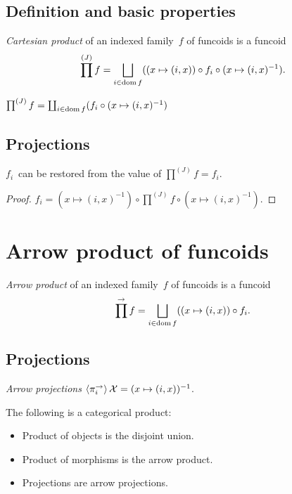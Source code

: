 \subsection{Definition and basic properties}

\begin{defn}
\emph{Cartesian product} of an indexed family~$f$ of funcoids is
a funcoid \[ \prod^{(J)} f=\bigsqcup_{i\in\dom f}((x\mapsto(i,x))\circ f_i\circ(x\mapsto(i,x)^{-1}). \]
\end{defn}

\begin{prop}
$\prod^{(J)} f=\coprod_{i\in\operatorname{dom} f}(f_i\circ(x\mapsto(i,x)^{-1})$
\end{prop}

\subsection{Projections}

\begin{thm}
$f_i$~can be restored from the value of $\prod^{(J)}f=f_i$.
\end{thm}

\begin{proof}
$f_i = (x\mapsto(i,x)^{-1})\circ\prod^{(J)}f\circ(x\mapsto(i,x)^{-1})$.
\end{proof}

\section{Arrow product of funcoids}

\begin{defn}
\emph{Arrow product} of an indexed family~$f$ of funcoids is
a funcoid \[ \prod^{\rightarrow} f=\bigsqcup_{i\in\dom f}((x\mapsto(i,x))\circ f_i. \]
\end{defn}

\subsection{Projections}

\begin{defn}
\emph{Arrow projections}
$\left\langle \pi^{\rightarrow}_i\right\rangle\mathcal{X} = (x\mapsto(i,x))^{-1}$.
\end{defn}

\begin{thm}
The following is a categorical product:
\begin{itemize}
\item Product of objects is the disjoint union.
\item Product of morphisms is the arrow product.
\item Projections are arrow projections.
\end{itemize}
\end{thm}


